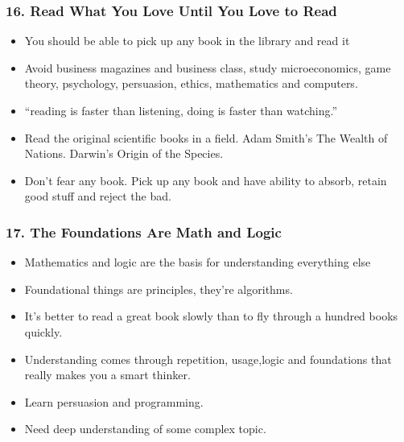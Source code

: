 \begin{frame}[fragile]
\frametitle{16. Read What You Love Until You Love to Read}
\begin{itemize}
\item You should be able to pick up any book in the library and read it
\item Avoid business magazines and business class, study microeconomics, game theory, psychology, persuasion, ethics, mathematics and computers.
\item ``reading is faster than listening, doing is faster than watching.''
\item Read the original scientific books in a field. Adam Smith’s The Wealth of Nations. Darwin’s Origin of the Species.
\item Don't fear any book. Pick up any book and have ability to absorb, retain good stuff and reject the bad.
\end{itemize}
\end{frame}

\begin{frame}[fragile]
\frametitle{17. The Foundations Are Math and Logic}
\begin{itemize}
\item Mathematics and logic are the basis for understanding everything else
\item Foundational things are principles, they’re algorithms.
\item It's better to read a great book slowly than to fly through a hundred books quickly.
\item Understanding comes through repetition, usage,logic and foundations that really makes you a smart thinker.
\item Learn persuasion and programming.
\item Need deep understanding of some complex topic.
\end{itemize}
\end{frame}

